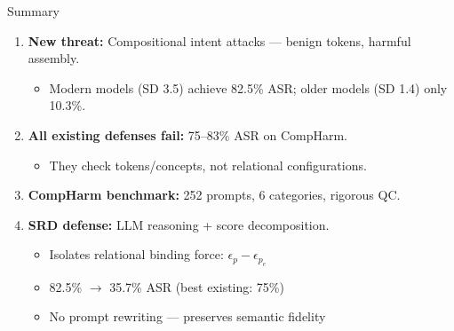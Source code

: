 \documentclass[aspectratio=169,12pt]{beamer}
\begin{document}
\begin{frame}{Summary}

\begin{enumerate}
\item \textbf{New threat:} Compositional intent attacks --- benign tokens, harmful assembly.
    \begin{itemize}
    \item Modern models (SD 3.5) achieve 82.5\% ASR; older models (SD 1.4) only 10.3\%.
    \end{itemize}

\vspace{8pt}

\item \textbf{All existing defenses fail:} 75--83\% ASR on CompHarm.
    \begin{itemize}
    \item They check tokens/concepts, not relational configurations.
    \end{itemize}

\vspace{8pt}

\item \textbf{CompHarm benchmark:} 252 prompts, 6 categories, rigorous QC.

\vspace{8pt}

\item \textbf{SRD defense:} LLM reasoning + score decomposition.
    \begin{itemize}
    \item Isolates relational binding force: $\epsilon_p - \epsilon_{p_e}$
    \item 82.5\% $\to$ 35.7\% ASR (best existing: 75\%)
    \item No prompt rewriting --- preserves semantic fidelity
    \end{itemize}
\end{enumerate}

\end{frame}
\end{document}
